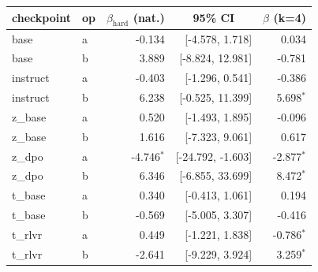 \begin{tabular}{llrrr}
\toprule
checkpoint & op & \multicolumn{1}{c}{$\beta_{\text{hard}}$ (nat.)} & \multicolumn{1}{c}{95\% CI} & \multicolumn{1}{c}{$\beta$ (k=4)} \\
\midrule
base & a & -0.134 & [-4.578, 1.718] & 0.034 \\
base & b & 3.889 & [-8.824, 12.981] & -0.781 \\
instruct & a & -0.403 & [-1.296, 0.541] & -0.386 \\
instruct & b & 6.238 & [-0.525, 11.399] & 5.698$^{*}$ \\
z\_base & a & 0.520 & [-1.493, 1.895] & -0.096 \\
z\_base & b & 1.616 & [-7.323, 9.061] & 0.617 \\
z\_dpo & a & -4.746$^{*}$ & [-24.792, -1.603] & -2.877$^{*}$ \\
z\_dpo & b & 6.346 & [-6.855, 33.699] & 8.472$^{*}$ \\
t\_base & a & 0.340 & [-0.413, 1.061] & 0.194 \\
t\_base & b & -0.569 & [-5.005, 3.307] & -0.416 \\
t\_rlvr & a & 0.449 & [-1.221, 1.838] & -0.786$^{*}$ \\
t\_rlvr & b & -2.641 & [-9.229, 3.924] & 3.259$^{*}$ \\
\bottomrule
\end{tabular}
